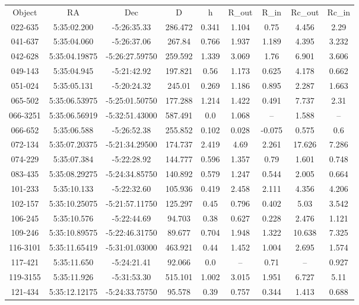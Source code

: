 \begin{table}
\begin{tabular}{ccccccccc}
Object & RA & Dec & D & h & R_out & R_in & Rc_out & Rc_in \\
022-635 & 5:35:02.200 & -5:26:35.33 & 286.472 & 0.341 & 1.104 & 0.75 & 4.456 & 2.29 \\
041-637 & 5:35:04.060 & -5:26:37.06 & 267.84 & 0.766 & 1.937 & 1.189 & 4.395 & 3.232 \\
042-628 & 5:35:04.19875 & -5:26:27.59750 & 259.592 & 1.339 & 3.069 & 1.76 & 6.901 & 3.606 \\
049-143 & 5:35:04.945 & -5:21:42.92 & 197.821 & 0.56 & 1.173 & 0.625 & 4.178 & 0.662 \\
051-024 & 5:35:05.131 & -5:20:24.32 & 245.01 & 0.269 & 1.186 & 0.895 & 2.287 & 1.663 \\
065-502 & 5:35:06.53975 & -5:25:01.50750 & 177.288 & 1.214 & 1.422 & 0.491 & 7.737 & 2.31 \\
066-3251 & 5:35:06.56919 & -5:32:51.43000 & 587.491 & 0.0 & 1.068 & -- & 1.588 & -- \\
066-652 & 5:35:06.588 & -5:26:52.38 & 255.852 & 0.102 & 0.028 & -0.075 & 0.575 & 0.6 \\
072-134 & 5:35:07.20375 & -5:21:34.29500 & 174.737 & 2.419 & 4.69 & 2.261 & 17.626 & 7.286 \\
074-229 & 5:35:07.384 & -5:22:28.92 & 144.777 & 0.596 & 1.357 & 0.79 & 1.601 & 0.748 \\
083-435 & 5:35:08.29275 & -5:24:34.85750 & 140.892 & 0.579 & 1.247 & 0.544 & 2.005 & 0.664 \\
101-233 & 5:35:10.133 & -5:22:32.60 & 105.936 & 0.419 & 2.458 & 2.111 & 4.356 & 4.206 \\
102-157 & 5:35:10.25075 & -5:21:57.11750 & 125.297 & 0.45 & 0.796 & 0.402 & 5.03 & 3.542 \\
106-245 & 5:35:10.576 & -5:22:44.69 & 94.703 & 0.38 & 0.627 & 0.228 & 2.476 & 1.121 \\
109-246 & 5:35:10.89575 & -5:22:46.31750 & 89.677 & 0.704 & 1.948 & 1.322 & 10.638 & 7.325 \\
116-3101 & 5:35:11.65419 & -5:31:01.03000 & 463.921 & 0.44 & 1.452 & 1.004 & 2.695 & 1.574 \\
117-421 & 5:35:11.650 & -5:24:21.41 & 92.066 & 0.0 & -- & 0.71 & -- & 0.927 \\
119-3155 & 5:35:11.926 & -5:31:53.30 & 515.101 & 1.002 & 3.015 & 1.951 & 6.727 & 5.11 \\
121-434 & 5:35:12.12175 & -5:24:33.75750 & 95.578 & 0.39 & 0.757 & 0.344 & 1.413 & 0.688 \\

\end{tabular}
\end{table}
